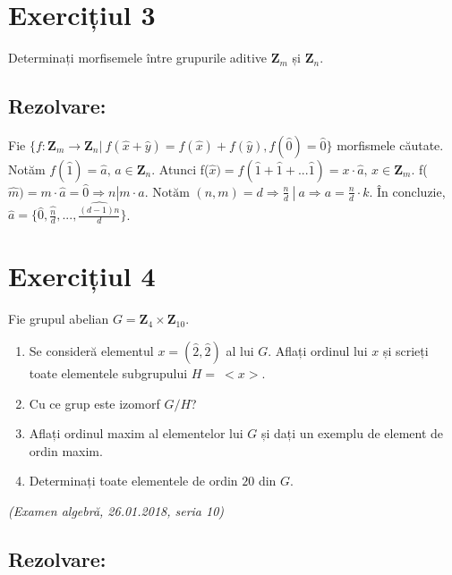 \documentclass{article}
\begin{document}
\section{Exercițiul 3}
Determinați morfisemele între grupurile aditive $\mathbf{Z}_m$ și $\mathbf{Z}_n$.
\subsection{Rezolvare:}
Fie $\{f: \mathbf{Z}_m \rightarrow \mathbf{Z}_n | \ f(\widehat{x} + \widehat{y}) = f(\widehat{x}) + f(\widehat{y}), f(\widehat{0}) = \widehat{0}\}$ morfismele căutate.
\newline \newline
Notăm $f(\widehat{1}) = \widehat{a}, \, a \in \mathbf{Z}_n$. Atunci f($\widehat{x}) = f(\widehat{1} + \widehat{1} + ... \widehat{1}) = x \cdot \widehat{a}, \,  x \in \mathbf{Z}_m$.
\newline \newline
f($\widehat{m}) = m \cdot \widehat{a} = \widehat{0} \Rightarrow n| m \cdot a. \text{ Notăm } (n, m) = d \Rightarrow \frac{n}{d} \ | \ a \Rightarrow a = \frac{n}{d} \cdot k$. 
\newline
În concluzie, $\widehat{a} = \{\widehat{0}, \widehat{\frac{n}{d}}, ..., \widehat{\frac{(d-1)n}{d}}\}$.
\section{Exercițiul 4}
Fie grupul abelian $G = \mathbf{Z}_{4} \times \mathbf{Z}_{10}$.

\begin{enumerate}
    \item Se consideră elementul $x = (\widehat{2}, \widehat{2})$ al lui $G$. Aflați ordinul lui $x$ și scrieți toate elementele subgrupului $H = \ <x>$.
    \item Cu ce grup este izomorf $G/H$?
    \item Aflați ordinul maxim al elementelor lui $G$ și dați un exemplu de element de ordin maxim.
    \item Determinați toate elementele de ordin $20$ din $G$.
\end{enumerate}
\emph{(Examen algebră, 26.01.2018, seria 10)}
\subsection{Rezolvare:}
\end{document}

